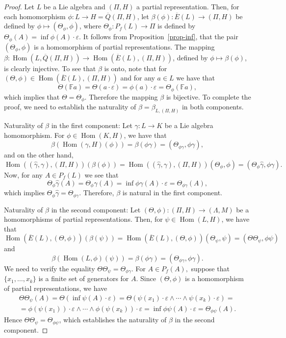 \documentclass{amsart}
\newcommand{\F}{\mathbb{F}}
\newcommand{\0}{{\vartheta}}
\theoremstyle{definition}
\theoremstyle{remark}
\numberwithin{equation}{section}
\newtheorem*{Theorem A}{\textbf{Theorem A}}
\newtheorem*{Corollary E}{\textbf{Corollary E}}
\newtheorem*{Corollary F}{\textbf{Corollary F}}
\newtheorem*{Theorem B}{\textbf{Theorem B}}
\newtheorem*{Theorem C}{\textbf{Theorem C}}
\newtheorem*{Theorem D}{\textbf{Theorem B}}
\newtheorem*{p a}{\textbf{Proof of  Theorem A}}
\newtheorem*{p b}{\textbf{Proof of Theorem B}}
\newtheorem*{p c}{\textbf{Proof of  Theorem C}}
\newtheorem*{p d}{\textbf{Proof of  Theorem D}}
\DeclareMathOperator{\Hom}{Hom}
\begin{document}
\begin{proof}
Let $L$ be a Lie algebra and $(\Pi,H)$ a partial representation. Then, for each homomorphism  
$\phi: L\to  H=\overline{Q}(\Pi , H)$, 
let $\beta(\phi):\overline{E}(L)\to (\Pi,H)$ be defined by $\phi\mapsto (\Theta_\phi,\phi)$, where $\Theta_\phi: P_f(L)\to \Pi$ is defined by $\Theta_\phi(A)=\inf \phi(A)\cdot \varepsilon$. It follows from Proposition~\ref{prop-inf}, that the pair  $(\Theta_\phi,\phi)$ is a homomorphism of partial representations. The mapping $\beta:\Hom(L,\overline{Q}(\Pi,H))\to \Hom(\overline{E}(L), (\Pi,H))$, defined by $\phi\mapsto \beta(\phi)$, is clearly injective. To see that $\beta$  is onto, note that for $(\Theta,\phi)\in \Hom(\overline{E}(L), (\Pi,H))$ and for any $a\in L$ we have that 
$$\Theta(\F a)=\Theta(a\cdot\varepsilon)=\phi(a)\cdot \varepsilon=\Theta_\phi(\F a),$$
which implies that $\Theta=\Theta_\phi$. Therefore the mapping $\beta $ is bijective. To complete the proof, we need to establish the naturality of  $\beta =\beta _{L,(\Pi,H)}$ in both components.

Naturality of $\beta$ in the first component: Let $\gamma:L\to K$ be a Lie algebra homomorphism. For $\phi\in \Hom(K,H)$, we have that 
$$\beta(\Hom(\gamma,H)(\phi))=\beta(\phi\gamma)=(\Theta_{\phi\gamma},\phi\gamma),$$
and on the other hand,
$$\Hom((\widehat\gamma,\gamma),(\Pi,H))(\beta(\phi))=\Hom((\widehat\gamma,\gamma),(\Pi,H))(\Theta_\phi,\phi)=(\Theta_\phi\widehat\gamma,\phi\gamma).$$
Now, for any $A\in P_f(L)$ we see that 
$$\Theta_\phi\hat\gamma(A)=\Theta_\phi\gamma(A)=\inf \phi\gamma(A)\cdot\varepsilon=\Theta_{\phi\gamma}(A),$$
which implies $\Theta_\phi\hat\gamma=\Theta_{\phi\gamma}.$ Therefore, $\beta$ is natural in the first component. 

Naturality of $\beta$ in the second component: Let $(\Theta,\phi):(\Pi, H) \to (\Lambda,M)$ be a homomorphisms of partial representations. Then, for $\psi\in \Hom(L,H)$, we have that 
$$\Hom(\overline{E}(L),(\Theta,\phi))(\beta(\psi))=\Hom(\overline{E}(L),(\Theta,\phi))(\Theta_\psi,\psi)=(\Theta\Theta_\psi,\phi\psi)$$
and 
$$\beta(\Hom(L,\phi)(\psi))=\beta(\phi\gamma)=(\Theta_{\phi\gamma},\phi\gamma).$$
We need to verify the equality $\Theta\Theta_\psi=\Theta_{\phi\gamma}$. For $A\in P_f(A),$ suppose that $\{x_1,\ldots,x_k\}$ is a finite set of generators for $A$. Since $(\Theta,\phi)$ is a homomorphism of partial representations, we have 
\begin{multline*}
    \Theta\Theta_\psi(A)=\Theta(\inf\psi(A)\cdot \varepsilon)=\Theta(\psi(x_1)\cdot\varepsilon\wedge\cdots\wedge \psi(x_k)\cdot\varepsilon)=\\=\phi(\psi(x_1))\cdot\varepsilon\wedge\cdots\wedge\phi(\psi(x_k))\cdot\varepsilon=\inf \phi\psi(A)\cdot\varepsilon=\Theta_{\phi\psi}(A).
\end{multline*}
Hence $ \Theta\Theta_\psi=\Theta_{\phi\psi}$, which establishes the naturality of $\beta$ in the second component.
\end{proof}
\end{document}
